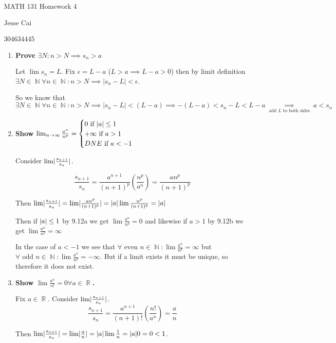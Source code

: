 \documentclass[10pt,a4paper]{article}
\DeclareMathOperator*{\R}{\mathbb{R}}
\DeclareMathOperator*{\N}{\mathbb{N}}
\DeclarePairedDelimiter{\abs}{\lvert}{\rvert}
\begin{document}
MATH 131 Homework 4

Jesse Cai

304634445

\begin{enumerate}
    \item \textbf{Prove $\exists N : n > N \implies s_n > a$}

        Let $\lim s_n = L$. Fix $\epsilon = L-a$  ($L > a \implies L-a > 0$) then by limit definition $\exists N \in \N \forall n \in \N : n > N \implies \lvert s_n - L \rvert < \epsilon$.

        So we know that $$\exists N \in \N \forall n \in \N: n > N \implies \lvert s_n - L \rvert <  (L-a) \implies   - (L-a) < s_n - L < L-a \underset{\text{ add $L$ to both sides }}{\implies} a < s_n$$ 


\item \textbf{Show $\lim_{n \to \infty} \frac{a^n}{n^p} = \begin{cases}
            0 \text{ if } \abs{a} \leq 1 \\
            +\infty \text{ if }  a > 1 \\
            DNE \text{ if }  a < -1 \\
    \end{cases}$}

        Consider $\lim \abs{\frac{s_{n+1}}{s_n}}$.

        $$ \frac{s_{n+1}}{s_n} = \frac{a^{n+1}}{(n+1)^p}\left(\frac{n^p}{a^n} \right )= \frac{an^p}{(n+1)^p}$$
       
        Then $\lim \abs{\frac{s_{n+1}}{s_n}} = \lim \abs{\frac{an^p}{(n+1)^p}} = \abs{a} \lim \frac{n^p}{(n+1)^p} = \abs{a}$

        Then if $\abs{a} \leq 1 $ by 9.12a we get $\lim \frac{a^n}{n^p} = 0$ and likewise if $a > 1 $ by 9.12b we get $\lim \frac{a^n}{n^p} = \infty$

        In the case of $a < -1$ we see that $\forall \text{ even } n \in \N: \lim \frac{a^n}{n^p} = \infty$ but  $\forall \text{ odd } n \in \N: \lim \frac{a^n}{n^p} = -\infty$. But if a limit exists it must be unique, so therefore it does not exist.

    \item \textbf{Show $\lim \frac{a^n}{n!} = 0 \forall a \in \R$.}

        Fix $a \in \R$. Consider $\lim \abs{\frac{s_{n+1}}{s_n}}$.
        $$ \frac{s_{n+1}}{s_n} = \frac{a^{n+1}}{(n+1)!}\left(\frac{n!}{a^n} \right )= \frac{a}{n}$$

        Then $\lim \abs{\frac{s_{n+1}}{s_n}} = \lim \abs{\frac{a}{n}} = \abs{a} \lim \frac{1}{n} = \abs{a}0 = 0 < 1$.


\end{enumerate}
\end{document}

